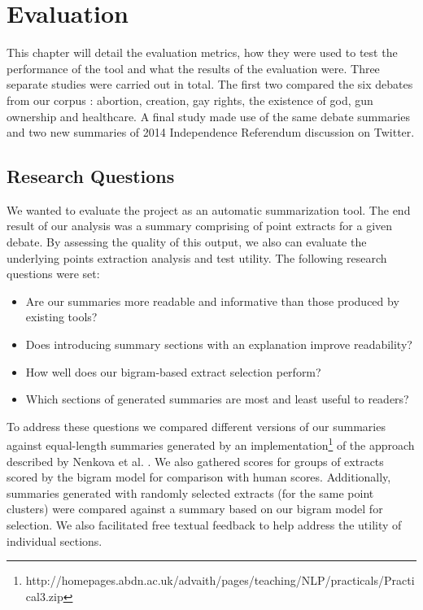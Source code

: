 \chapter{Evaluation\label{chap:evaluation}}
  This chapter will detail the evaluation metrics, how they were used to test the performance of the tool and what the results of the evaluation were. Three separate studies were carried out in total. The first two compared the six debates from our corpus \cite{walker2012corpus}: abortion, creation, gay rights, the existence of god, gun ownership and healthcare. A final study made use of the same debate summaries and two new summaries of 2014 Independence Referendum discussion on Twitter.

  \section{Research Questions}
    We wanted to evaluate the project as an automatic summarization tool. The end result of our analysis was a summary comprising of point extracts for a given debate. By assessing the quality of this output, we also can evaluate the underlying points extraction analysis and test utility. The following research questions were set:

    \begin{itemize}
      \item{Are our summaries more readable and informative than those produced by existing tools?}
      \item{Does introducing summary sections with an explanation improve readability?}
      \item{How well does our bigram-based extract selection perform?}
      \item{Which sections of generated summaries are most and least useful to readers?}
    \end{itemize}

    To address these questions we compared different versions of our summaries against equal-length summaries generated by an implementation\footnote{http://homepages.abdn.ac.uk/advaith/pages/teaching/NLP/practicals/Practical3.zip} of the approach described by Nenkova et al. \cite{nenkova2006compositional}. We also gathered scores for groups of extracts scored by the bigram model for comparison with human scores. Additionally, summaries generated with randomly selected extracts (for the same point clusters) were compared against a summary based on our bigram model for selection. We also facilitated free textual feedback to help address the utility of individual sections.

